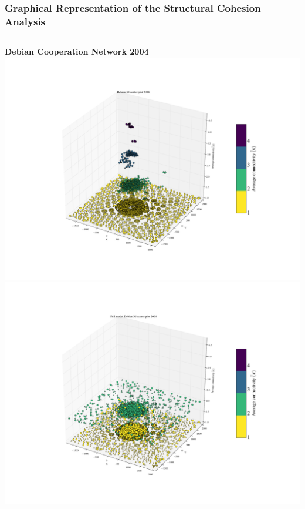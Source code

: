 \documentclass[ignorenonframetext,red,8pt,notes=show]{beamer}
\begin{document}
\begin{frame}
\frametitle{Graphical Representation of the Structural Cohesion Analysis}

\begin{columns}[c]
\begin{column}{0.5\textwidth}
\begin{center}
\textbf{Debian Cooperation Network 2004}
\includegraphics[scale=0.12]{../../figures/3d_scatter_debian_2004}
\newline
\includegraphics[scale=0.12]{../../figures/3d_scatter_debian_2004_null}
\end{center}
\end{column}


\end{columns}
\end{frame}
\end{document}
